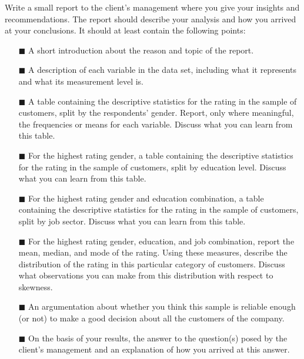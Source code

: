 Write a small report to the client's management where you give your insights and recommendations. The report should describe your analysis and how you arrived at your conclusions. It should at least contain the following points: \\

\begin{itemize}
    \item[$\blacksquare$] A short introduction about the reason and topic of the report.
    \item[$\blacksquare$] A description of each variable in the  data set, including what it represents and what its measurement level is. 
    \item[$\blacksquare$] A table containing the descriptive statistics for the rating in the sample of customers, split by the respondents' gender. Report, only where meaningful, the frequencies or means for each variable. Discuss what you can learn from this table. 
    \item[$\blacksquare$] For the highest rating gender, a table containing the descriptive statistics for the rating in the sample of customers, split by education level. Discuss what you can learn from this table. 
    \item[$\blacksquare$] For the highest rating gender and education combination, a table containing the descriptive statistics for the rating in the sample of customers, split by job sector. Discuss what you can learn from this table. 
    \item[$\blacksquare$] For the highest rating gender, education, and job combination, report the mean, median, and mode of the rating. Using these measures, describe the distribution of the rating in this particular category of customers. Discuss what observations you can make from this distribution with respect to skewness. 
    \item[$\blacksquare$] An argumentation about whether you think this sample is reliable enough (or not) to make a good decision about all the customers of the company.
    \item[$\blacksquare$] On the basis of your results, the answer to the question(s) posed by the client's management and an explanation of how you arrived at this answer.
\end{itemize}

\clearpage %
